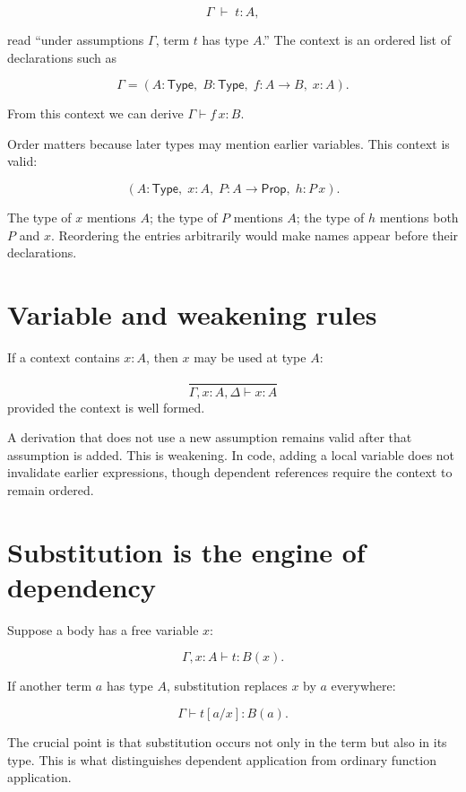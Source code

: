 \documentclass[10pt,letterpaper,oneside,openany]{report}
\newcommand{\judges}[3]{#1\;\vdash\;#2 : #3}
\begin{document}
\[
\judges{\Gamma}{t}{A},
\]

read ``under assumptions $\Gamma$, term $t$ has type $A$.''  The context is an ordered list of declarations such as

\[
\Gamma = (A : \mathsf{Type},\; B : \mathsf{Type},\; f : A \to B,\; x : A).
\]

From this context we can derive $\Gamma \vdash f\,x : B$.

Order matters because later types may mention earlier variables.  This context is valid:

\[
(A : \mathsf{Type},\; x : A,\; P : A \to \mathsf{Prop},\; h : P\,x).
\]

The type of $x$ mentions $A$; the type of $P$ mentions $A$; the type of $h$ mentions both $P$ and $x$.  Reordering the entries arbitrarily would make names appear before their declarations.

\section{Variable and weakening rules}

If a context contains $x:A$, then $x$ may be used at type $A$:

\begin{formalbox}[Variable]
\[
\frac{}{\Gamma, x:A, \Delta \vdash x:A}
\]
provided the context is well formed.
\end{formalbox}

A derivation that does not use a new assumption remains valid after that assumption is added.  This is weakening.  In code, adding a local variable does not invalidate earlier expressions, though dependent references require the context to remain ordered.

\section{Substitution is the engine of dependency}

Suppose a body has a free variable $x$:

\[
\Gamma, x:A \vdash t : B(x).
\]

If another term $a$ has type $A$, substitution replaces $x$ by $a$ everywhere:

\[
\Gamma \vdash t[a/x] : B(a).
\]

The crucial point is that substitution occurs not only in the term but also in its type.  This is what distinguishes dependent application from ordinary function application.
\end{document}
